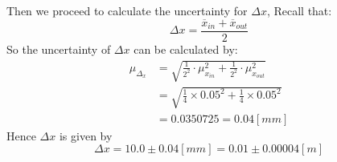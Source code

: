 \documentclass[11pt,a4paper]{article}
\begin{document}
Then we proceed to calculate the uncertainty for $\Delta x$, Recall that:
\begin{equation}
    \Delta x=\frac{\overline x_{in}+\overline x_{out}}{2}
    \nonumber
\end{equation}
\qquad So the uncertainty of $\Delta x$ can be calculated by: 
\begin{equation*}
    \begin{split}
    \mu_{\Delta_x}&=\sqrt{\frac{1}{2^2}\cdot \mu_{x_{in}}^2+\frac{1}{2^2}\cdot \mu_{x_{out}}^2}\\
    &=\sqrt{\frac{1}{4}\times 0.05^2+\frac{1}{4}\times 0.05^2}\\
    &=0.0350725=0.04[mm]
    \end{split}
\end{equation*}
\qquad Hence $\Delta x$ is given by $$\Delta x= 10.0\pm 0.04[mm]=0.01\pm0.00004[m]$$\\
\end{document}
